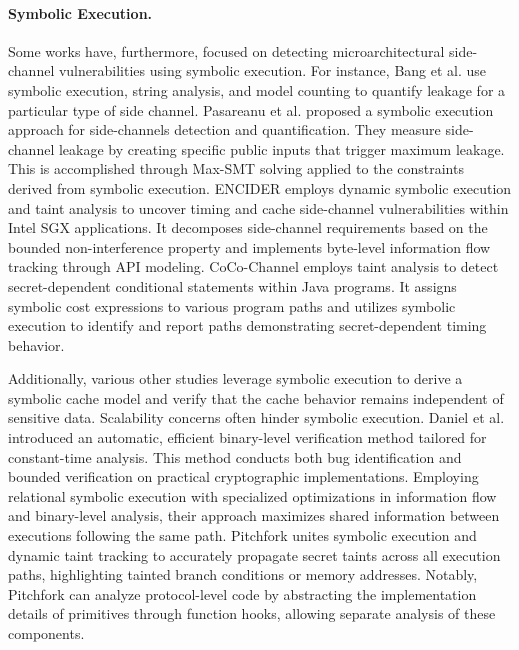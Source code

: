 \paragraph{Symbolic Execution.} Some works \cite{binsec, pitchfork, sung2018canal, chattopadhyay2018symbolic, brotzman2019casym, brennan2018symbolic, yavuz2022encider, pasareanu2016multi, bang2016string} have, furthermore, focused on detecting microarchitectural side-channel vulnerabilities using symbolic execution. For instance, Bang et al. \cite{bang2016string} use symbolic execution, string analysis, and model counting to quantify leakage for a particular type of side channel. Pasareanu et al. \cite{pasareanu2016multi} proposed a symbolic execution approach for side-channels detection and quantification. They measure side-channel leakage by creating specific public inputs that trigger maximum leakage. This is accomplished through Max-SMT solving applied to the constraints derived from symbolic execution. ENCIDER \cite{yavuz2022encider} employs dynamic symbolic execution and taint analysis to uncover timing and cache side-channel vulnerabilities within Intel SGX applications. It decomposes side-channel requirements based on the bounded non-interference property and implements byte-level information flow tracking through API modeling. CoCo-Channel \cite{brennan2018symbolic} employs taint analysis to detect secret-dependent conditional statements within Java programs. It assigns symbolic cost expressions to various program paths and utilizes symbolic execution to identify and report paths demonstrating secret-dependent timing behavior.

Additionally, various other studies \cite{sung2018canal, chattopadhyay2018symbolic, brotzman2019casym} leverage symbolic execution to derive a symbolic cache model and verify that the cache behavior remains independent of sensitive data. Scalability concerns often hinder symbolic execution. Daniel et al. \cite{binsec} introduced an automatic, efficient binary-level verification method tailored for constant-time analysis. This method conducts both bug identification and bounded verification on practical cryptographic implementations. Employing relational symbolic execution with specialized optimizations in information flow and binary-level analysis, their approach maximizes shared information between executions following the same path. Pitchfork \cite{pitchfork} unites symbolic execution and dynamic taint tracking to accurately propagate secret taints across all execution paths, highlighting tainted branch conditions or memory addresses. Notably, Pitchfork can analyze protocol-level code by abstracting the implementation details of primitives through function hooks, allowing separate analysis of these components. 

